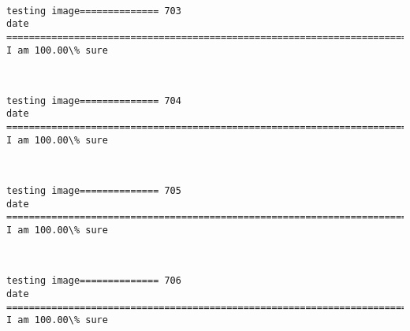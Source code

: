 \documentclass[11pt]{article}
\begin{document}
    \begin{center}
    \end{center}
    { \hspace*{\fill} \\}
    
    \begin{Verbatim}[commandchars=\\\{\}]
testing image============== 703
date
============================================================================
I am 100.00\% sure

    \end{Verbatim}

    \begin{center}
    \end{center}
    { \hspace*{\fill} \\}
    
    \begin{Verbatim}[commandchars=\\\{\}]
testing image============== 704
date
============================================================================
I am 100.00\% sure

    \end{Verbatim}

    \begin{center}
    \end{center}
    { \hspace*{\fill} \\}
    
    \begin{Verbatim}[commandchars=\\\{\}]
testing image============== 705
date
============================================================================
I am 100.00\% sure

    \end{Verbatim}

    \begin{center}
    \end{center}
    { \hspace*{\fill} \\}
    
    \begin{Verbatim}[commandchars=\\\{\}]
testing image============== 706
date
============================================================================
I am 100.00\% sure

    \end{Verbatim}
\end{document}
